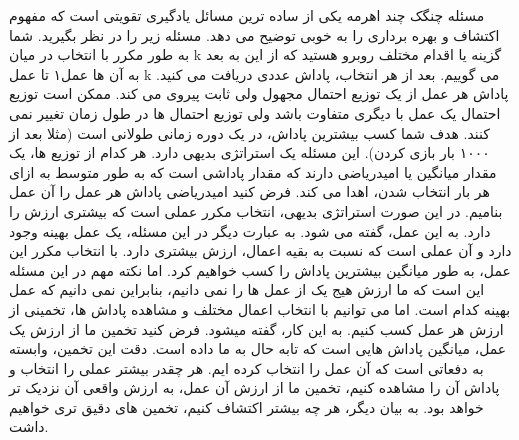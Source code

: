 مسئله چنگک چند اهرمه یکی از ساده ترین مسائل یادگیری تقویتی است که مفهوم اکتشاف و بهره برداری را به خوبی توضیح می دهد. مسئله زیر را در نظر بگیرید. شما به طور مکرر با انتخاب در میان k گزینه یا اقدام مختلف روبرو هستید که از این به بعد به آن ها عمل۱ تا عمل k می گوییم. بعد از هر انتخاب، پاداش عددی دریافت می کنید. پاداش هر عمل از یک توزیع احتمال مجهول ولی ثابت پیروی می کند. ممکن است توزیع احتمال یک عمل با دیگری متفاوت باشد ولی توزیع احتمال ها در طول زمان تغییر نمی کنند. هدف شما کسب بیشترین پاداش، در یک دوره زمانی طولانی است (مثلا بعد از ۱۰۰۰ بار بازی کردن). 
 این مسئله یک استراتژی بدیهی دارد. هر کدام از توزیع ها، یک مقدار میانگین یا امیدریاضی دارند که مقدار پاداشی است که به طور متوسط به ازای هر بار انتخاب شدن، اهدا می کند. فرض کنید امیدریاضی پاداش هر عمل را  آن عمل بنامیم. در این صورت استراتژی بدیهی، انتخاب مکرر عملی است که بیشتری ارزش را دارد. به این عمل،  
 گفته می شود. به عبارت دیگر در این مسئله، یک عمل بهینه وجود دارد و آن عملی است که نسبت به بقیه اعمال، ارزش بیشتری دارد. با انتخاب مکرر این عمل، به طور میانگین بیشترین پاداش را کسب خواهیم کرد. اما نکته مهم در این مسئله این است که ما ارزش هیج یک از عمل ها را نمی دانیم، بنابراین نمی دانیم که عمل بهینه کدام است. اما می توانیم با انتخاب اعمال مختلف و مشاهده پاداش ها، تخمینی از ارزش هر عمل کسب کنیم. به این کار،  گفته می\nf شود. فرض کنید تخمین ما از ارزش یک عمل، میانگین پاداش هایی است که تابه حال به ما داده است. دقت این تخمین، وابسته به دفعاتی است که آن عمل را انتخاب کرده ایم. هر چقدر بیشتر عملی را انتخاب و پاداش آن را مشاهده کنیم، تخمین ما از ارزش آن عمل، به ارزش واقعی آن نزدیک تر خواهد بود. به بیان دیگر، هر چه بیشتر اکتشاف کنیم، تخمین های دقیق تری خواهیم داشت.
%

